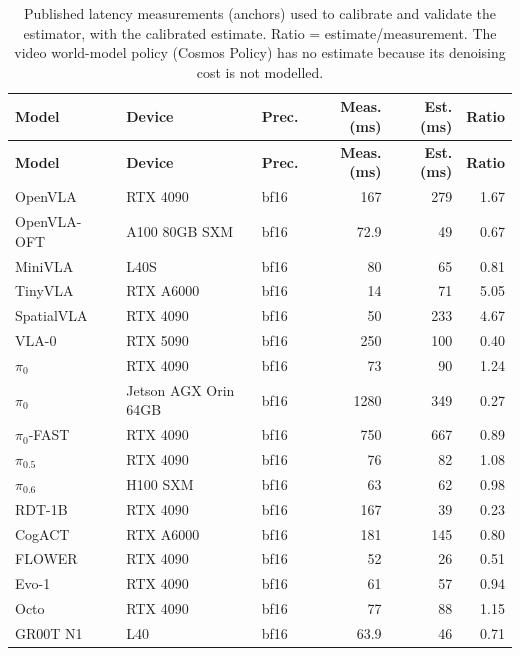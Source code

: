 \begin{longtable}{@{}p{3.3cm} p{3.6cm} l r r r@{}}
\caption{Published latency measurements (anchors) used to calibrate and validate the estimator, with the calibrated estimate. Ratio = estimate/measurement. The video world-model policy (Cosmos Policy) has no estimate because its denoising cost is not modelled.\label{tab:anchors}}\\
\toprule
\textbf{Model} & \textbf{Device} & \textbf{Prec.} & \textbf{Meas. (ms)} & \textbf{Est. (ms)} & \textbf{Ratio}\\
\midrule
\endfirsthead
\toprule
\textbf{Model} & \textbf{Device} & \textbf{Prec.} & \textbf{Meas. (ms)} & \textbf{Est. (ms)} & \textbf{Ratio}\\
\midrule
\endhead
\bottomrule
\endfoot
OpenVLA~\cite{ax240609246} & RTX 4090 & bf16 & 167 & 279 & 1.67\\
OpenVLA-OFT~\cite{ax250219645} & A100 80GB SXM & bf16 & 72.9 & 49 & 0.67\\
MiniVLA~\cite{web-minivla} & L40S & bf16 & 80 & 65 & 0.81\\
TinyVLA~\cite{ax240912514} & RTX A6000 & bf16 & 14 & 71 & 5.05\\
SpatialVLA~\cite{ax250115830} & RTX 4090 & bf16 & 50 & 233 & 4.67\\
VLA-0~\cite{ax251013054} & RTX 5090 & bf16 & 250 & 100 & 0.40\\
$\pi_0$~\cite{ax241024164} & RTX 4090 & bf16 & 73 & 90 & 1.24\\
$\pi_0$~\cite{ax241024164} & Jetson AGX Orin 64GB & bf16 & 1280 & 349 & 0.27\\
$\pi_0$-FAST~\cite{ax250109747} & RTX 4090 & bf16 & 750 & 667 & 0.89\\
$\pi_{0.5}$~\cite{ax250416054} & RTX 4090 & bf16 & 76 & 82 & 1.08\\
$\pi_{0.6}$~\cite{web-pi0-6} & H100 SXM & bf16 & 63 & 62 & 0.98\\
RDT-1B~\cite{ax241007864} & RTX 4090 & bf16 & 167 & 39 & 0.23\\
CogACT~\cite{ax241119650} & RTX A6000 & bf16 & 181 & 145 & 0.80\\
FLOWER~\cite{ax250904996} & RTX 4090 & bf16 & 52 & 26 & 0.51\\
Evo-1~\cite{ax251104555} & RTX 4090 & bf16 & 61 & 57 & 0.94\\
Octo~\cite{ax240512213} & RTX 4090 & bf16 & 77 & 88 & 1.15\\
GR00T N1~\cite{ax250314734} & L40 & bf16 & 63.9 & 46 & 0.71\\

\end{longtable}
